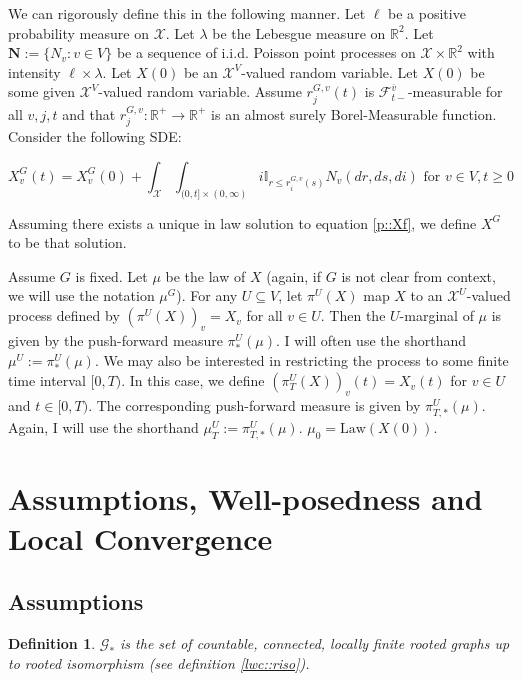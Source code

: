 \documentclass[12pt]{article}
\newcommand{\mb}{\mathbb}
\newcommand{\mc}{\mathcal}
\newcommand{\ra}{\rightarrow}
\newcommand{\ov}{\overline}
\newcommand{\te}{\text}
\newcommand{\ind}{\hspace{24pt}}
\newcommand{\defeq}{:=}								%
\newcommand{\sta}{\mc{X}}							%
\newcommand{\cl}[1]{\ov{#1}}						%
\newcommand{\Xf}{X}									%
\newcommand{\poiss}{N}								%
\newcommand{\leb}{\lambda}							%
\newcommand{\Sm}{\ell}								%
\newcommand{\rate}{r}								%
\newcommand{\F}{\mc{F}}								%
\newcommand{\m}{\mu}								%
\newcommand{\proj}{\pi}								%
\newcommand{\poisses}{\mathbf{N}}					%
\newcommand{\poissv}[1]{_{#1}}						%
\newcommand{\vind}[1]{_{#1}}						%
\newcommand{\tme}[1]{(#1)}							%
\newcommand{\gind}[1]{^{#1}}						%
\newcommand{\vpara}[1]{^{#1}}						%
\newcommand{\stpara}[1]{_{#1}}						%
\newcommand{\tpara}[1]{_{#1}}						%
\newcommand{\gvpara}[2]{^{#1,#2}}					%
\newcommand{\psf}{_*}								%
\newcommand{\tparapsf}[1]{_{#1,*}}					%
\newcommand{\Gs}{\mc{G}_\ast}						%
\newcommand{\law}{\te{Law}}							%
\newtheorem{defn}[thms]{Definition}
\begin{document}
\ind We can rigorously define this in the following manner. Let \(\Sm\) be a positive probability measure on \(\sta\). Let \(\leb\) be the Lebesgue measure on \(\mb{R}^2\). Let \(\poisses \defeq \{\poiss\poissv{v}:v \in V\}\) be a sequence of i.i.d. Poisson point processes on \(\sta\times \mb{R}^2\) with intensity \(\Sm\times \leb\). Let \(\Xf\tme{0}\) be an \(\sta^V\)-valued random variable. Let \(\Xf\tme{0}\) be some given \(\sta^V\)-valued random variable. Assume \(\rate\gvpara{G}{v}\stpara{j}(t)\) is \(\F\vpara{\cl{v}}\tpara{t-}\)-measurable for all \(v,j,t\) and that \(\rate\gvpara{G}{v}\stpara{j}:\mb{R}^+ \ra\mb{R}^+\) is an almost surely Borel-Measurable function. Consider the following SDE:

\begin{equation}
\Xf\gind{G}\vind{v}\tme{t} = \Xf\gind{G}\vind{v}\tme{0} + \int_{\sta}\int_{(0,t]\times (0,\infty)} i\mb{I}_{r \leq \rate\gvpara{G}{v}\stpara{i}(s)} \poiss\poissv{v}\left(dr,ds,di\right) \te{ for } v\in V, t \geq 0
\label{p::Xf}
\end{equation}

Assuming there exists a unique in law solution to equation \eqref{p::Xf}, we define \(\Xf\gind{G}\) to be that solution. 

\ind Assume \(G\) is fixed. Let \(\m\) be the law of \(\Xf\) (again, if \(G\) is not clear from context, we will use the notation \(\m\gind{G}\)). For any \(U \subseteq V\), let \(\proj\vpara{U}(\Xf)\) map \(\Xf\) to an \(\sta^U\)-valued process defined by \((\proj\vpara{U}(\Xf))\vind{v} = \Xf\vind{v}\) for all \(v\in U\). Then the \(U\)-marginal of \(\m\) is given by the push-forward measure \(\proj\vpara{U}\psf(\m)\). I will often use the shorthand \(\m\vpara{U} \defeq \proj\psf\vpara{U}(\m)\). We may also be interested in restricting the process to some finite time interval \([0,T)\). In this case, we define \((\proj\vpara{U}\tpara{T}(\Xf))\vind{v}\tme{t} = \Xf\vind{v}\tme{t}\) for \(v \in U\) and \(t \in [0,T)\). The corresponding push-forward measure is given by \(\proj\vpara{U}\tparapsf{T}(\m)\). Again, I will use the shorthand \(\m\vpara{U}\tpara{T} \defeq \proj\vpara{U}\tparapsf{T}(\m)\). \(\m\tpara{0} = \law(\Xf\tme{0})\).

\section{Assumptions, Well-posedness and Local Convergence}
\label{awl}
\subsection{Assumptions}
\label{awl::a}
\begin{defn}
\(\Gs\) is the set of countable, connected, locally finite rooted graphs up to rooted isomorphism (see definition \ref{lwc::riso}).
\label{a::gstar}
\end{defn}
\end{document}
